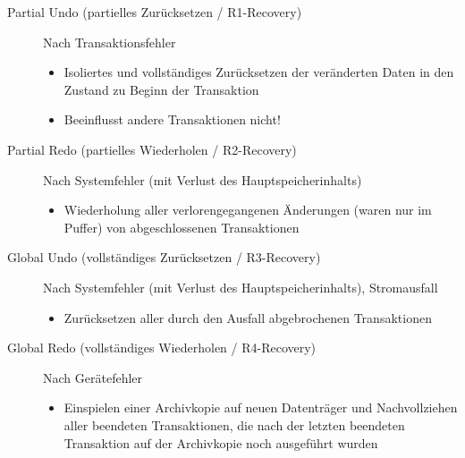 \documentclass{bschlangaul-theorie}
\begin{document}
\begin{description}

%

\item[Partial Undo (partielles Zurücksetzen / R1-Recovery)]

Nach Transaktionsfehler

\begin{itemize}
\item Isoliertes und vollständiges Zurücksetzen der veränderten Daten in
den Zustand zu Beginn der Transaktion

\item Beeinflusst andere Transaktionen nicht!
\end{itemize}

%

\item[Partial Redo (partielles Wiederholen / R2-Recovery)]

Nach Systemfehler (mit Verlust des Hauptspeicherinhalts)

\begin{itemize}
\item Wiederholung aller verlorengegangenen Änderungen (waren nur im
Puffer) von abgeschlossenen Transaktionen
\end{itemize}

%

\item[Global Undo (vollständiges Zurücksetzen / R3-Recovery)]

Nach Systemfehler (mit Verlust des Hauptspeicherinhalts), \zB
Stromausfall

\begin{itemize}
\item Zurücksetzen aller durch den Ausfall abgebrochenen Transaktionen
\end{itemize}

%

\item[Global Redo (vollständiges Wiederholen / R4-Recovery)]

Nach Gerätefehler

\begin{itemize}
\item Einspielen einer Archivkopie auf neuen Datenträger und
Nachvollziehen aller beendeten Transaktionen, die nach der letzten
beendeten Transaktion auf der Archivkopie noch ausgeführt wurden
\end{itemize}

\end{description}
\end{document}
